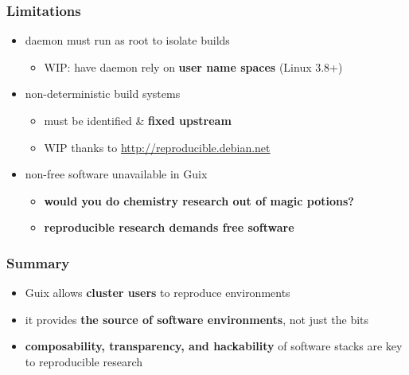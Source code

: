 \documentclass{beamer}
\newcommand{\highlight}[1]{\alert{\textbf{#1}}}
\begin{document}
\begin{frame}
  \frametitle{Limitations}

  \Large{
    \begin{itemize}
      \setlength\itemsep{1em}
    \item{daemon must run as root to isolate builds
      \begin{itemize}
      \item<2-> \large{WIP: have daemon rely on \textbf{user name
          spaces} (Linux 3.8+)}
    \end{itemize}}
    \item{non-deterministic build systems
      \begin{itemize}
      \item<3-> \large{must be identified \& \textbf{fixed upstream}}
      \item<3-> WIP thanks to \url{http://reproducible.debian.net}
      \end{itemize}}
    \item{non-free software unavailable in Guix
      \begin{itemize}
      \item<4-> \textbf<4>{\large{would you do chemistry research out of magic
        potions?}}
      \item<5-> \textbf{\large{reproducible research demands free software}}
    \end{itemize}}
    \end{itemize}
  }
\end{frame}

\begin{frame}
  \frametitle{Summary}

  \Large{
    \begin{itemize}
    \item<1-> Guix allows \highlight{cluster users} to reproduce
      environments
    \item<2-> it provides \highlight{the source of software
      environments}, not just the bits
    \item<3-> \highlight{composability, transparency, and hackability}
      of software stacks are key to reproducible research
    \end{itemize}
  }
\end{frame}

\end{document}
